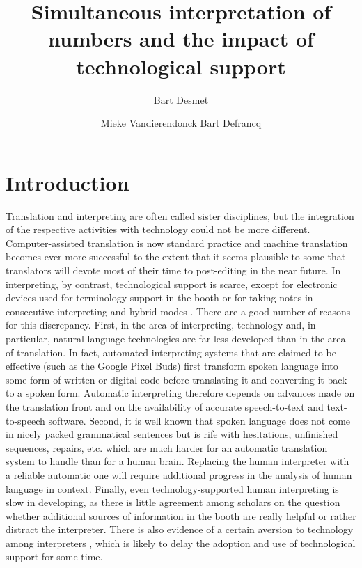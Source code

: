 \documentclass[output=paper]{langsci/langscibook}
\title{Simultaneous interpretation of numbers and the impact of technological support}
\author{%
 Bart Desmet\affiliation{University of Eden}\and%
 Mieke Vandierendonck\affiliation{University of Eden}\lastand%
 Bart Defrancq\affiliation{University of Eden}
}
\begin{document}

 

 
\section{Introduction}
Translation and interpreting are often called sister disciplines, but the integration of the respective activities with technology could not be more different. Computer-assisted translation is now standard practice and machine translation becomes ever more successful to the extent that it seems plausible to some that translators will devote most of their time to post-editing in the near future. In interpreting, by contrast, technological support is scarce, except for electronic devices used for terminology support in the booth \citep{Fantinuoli2012} or for taking notes in consecutive interpreting and hybrid modes \citep{Orlando2014,Orlando2016,Goldsmith2017}. There are a good number of reasons for this discrepancy. First, in the area of interpreting, technology and, in particular, natural language technologies are far less developed than in the area of translation. In fact, automated interpreting systems that are claimed to be effective (such as the Google Pixel Buds) first transform spoken language into some form of written or digital code before translating it and converting it back to a spoken form. Automatic interpreting therefore depends on advances made on the translation front and on the availability of accurate speech-to-text and text-to-speech software. Second, it is well known that spoken language does not come in nicely packed grammatical sentences but is rife with hesitations, unfinished sequences, repairs, etc. which are much harder for an automatic translation system to handle than for a human brain. Replacing the human interpreter with a reliable automatic one will require additional progress in the analysis of human language in context. Finally, even technology-supported human interpreting is slow in developing, as there is little agreement among scholars on the question whether additional sources of information in the booth are really helpful or rather distract the interpreter. There is also evidence of a certain aversion to technology among interpreters \citep{CorpasPastor2016}, which is likely to delay the adoption and use of technological support for some time. 
\end{document}

